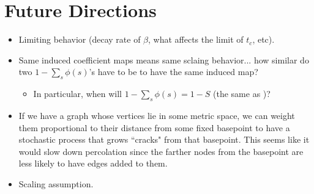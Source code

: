 \documentclass[twoside,10pt]{article}
\begin{document}

\section{Future Directions}

\begin{itemize}
	\item Limiting behavior (decay rate of $\beta$, what affects the limit of $t_{c}$, etc).
	\item Same induced coefficient maps means same sclaing behavior... how similar do two $1-\sum_s \phi(s)$'s have to be to have the same induced map?
		\begin{itemize}
			\item In particular, when will $1-\sum_s \phi(s) = 1-S$ (the same as \ER)?
		\end{itemize}
	\item If we have a graph whose vertices lie in some metric space, we can weight them proportional to their distance from some fixed basepoint to have a stochastic process that grows ``cracks" from that basepoint. This seems like it would slow down percolation since the farther nodes from the basepoint are less likely to have edges added to them.
	\item Scaling assumption.
\end{itemize}

\printbibliography
\end{document}
